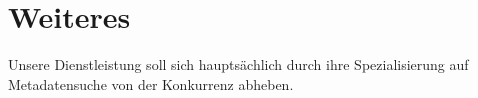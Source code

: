 
\chapter{Weiteres}
Unsere Dienstleistung soll sich hauptsächlich durch ihre Spezialisierung auf
Metadatensuche von der Konkurrenz abheben. 
